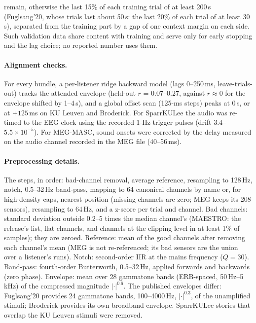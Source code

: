 \documentclass[10pt,twocolumn,letterpaper]{article}
\begin{document}
remain, otherwise the last 15\% of each training trial of at least 200\,s (Fuglsang'20,
whose trials last about 50\,s: the last 20\% of each trial of at least 30\,s), separated
from the training part by a gap of one context margin on each side. Such validation data share
content with training and serve only for early stopping and the lag choice; no reported
number uses them.
\begin{table}[h]\centering\small
\caption{Content groups recovered from the audio. Groups per listener: how many groups one
listener heard. Single-trial groups: content heard in one trial only. Links: 64-Hz-confirmed links that
merged two components (trials $-$ groups). Last two columns: best 8-Hz match of a 10-s
chunk in another group, and the 64-Hz correlation at that location: the chance level the
0.95 threshold must exceed.}\label{tab:groups}
\resizebox{\textwidth}{!}{}
\end{table}

\paragraph{Alignment checks.} For every bundle, a per-listener ridge backward model
(lags 0--250\,ms, leave-trials-out) tracks the attended envelope
(held-out $r$ = 0.07--0.27, against $r\approx0$ for the envelope shifted by 1--4\,s), and a
global offset scan (125-ms steps) peaks at 0\,s, or at $+125$\,ms on KU Leuven and Broderick.
For SparrKULee the audio was re-timed to the EEG clock using the recorded 1-Hz trigger
pulses (drift $3.4$--$5.5\times10^{-5}$). For MEG-MASC, sound onsets were corrected by the
delay measured on the audio channel recorded in the MEG file (40--56\,ms).

\paragraph{Preprocessing details.} The steps, in order: bad-channel removal, average
reference, resampling to 128\,Hz, notch, 0.5--32\,Hz band-pass, mapping to 64 canonical
channels by name or, for high-density caps, nearest position (missing channels are zero; MEG
keeps its 208 sensors), resampling to 64\,Hz, and a z-score per trial and channel. Bad channels: standard deviation outside 0.2--5 times the
median channel's (MAESTRO: the release's list, flat channels, and channels at the clipping
level in at least 1\% of samples); they are zeroed. Reference: mean of the good channels
after removing each channel's mean (MEG is not re-referenced; its bad sensors are the union
over a listener's runs). Notch: second-order IIR at the mains frequency ($Q=30$). Band-pass:
fourth-order Butterworth, 0.5--32\,Hz, applied forwards and backwards (zero phase). Envelope:
mean over 28 gammatone bands (ERB-spaced, 50\,Hz--5\,kHz) of the compressed magnitude
$|\cdot|^{0.6}$. The published envelopes differ: Fuglsang'20 provides 24 gammatone bands,
100--4000\,Hz, $|\cdot|^{0.3}$, of the unamplified stimuli; Broderick provides its own
broadband envelope. SparrKULee stories that overlap the KU Leuven stimuli were removed.
\end{document}
